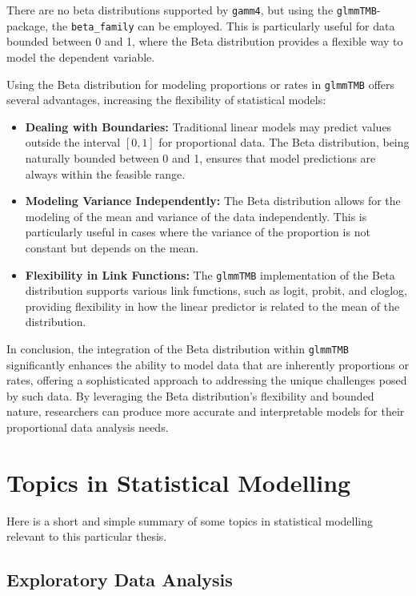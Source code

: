 \documentclass[12pt, twoside,hidelinks]{article}
\theoremstyle{definition}
\numberwithin{equation}{section}
\begin{document}
There are no beta distributions supported by \texttt{gamm4}, but using the \texttt{glmmTMB}-package, the \texttt{beta\_family} can be employed. This is particularly useful for data bounded between 0 and 1, where the Beta distribution provides a flexible way to model the dependent variable.



Using the Beta distribution for modeling proportions or rates in \texttt{glmmTMB} offers several advantages, increasing the flexibility of statistical models:

\begin{itemize}
    \item \textbf{Dealing with Boundaries:} Traditional linear models may predict values outside the interval \([0, 1]\) for proportional data. The Beta distribution, being naturally bounded between 0 and 1, ensures that model predictions are always within the feasible range.
    \item \textbf{Modeling Variance Independently:} The Beta distribution allows for the modeling of the mean and variance of the data independently. This is particularly useful in cases where the variance of the proportion is not constant but depends on the mean.
    \item \textbf{Flexibility in Link Functions:} The \texttt{glmmTMB} implementation of the Beta distribution supports various link functions, such as logit, probit, and cloglog, providing flexibility in how the linear predictor is related to the mean of the distribution.
\end{itemize}

In conclusion, the integration of the Beta distribution within \texttt{glmmTMB} significantly enhances the ability to model data that are inherently proportions or rates, offering a sophisticated approach to addressing the unique challenges posed by such data. By leveraging the Beta distribution's flexibility and bounded nature, researchers can produce more accurate and interpretable models for their proportional data analysis needs.



\section{Topics in Statistical Modelling}

Here is a short and simple summary of some topics in statistical modelling relevant to this particular thesis. 


\subsection{Exploratory Data Analysis}
\end{document}
